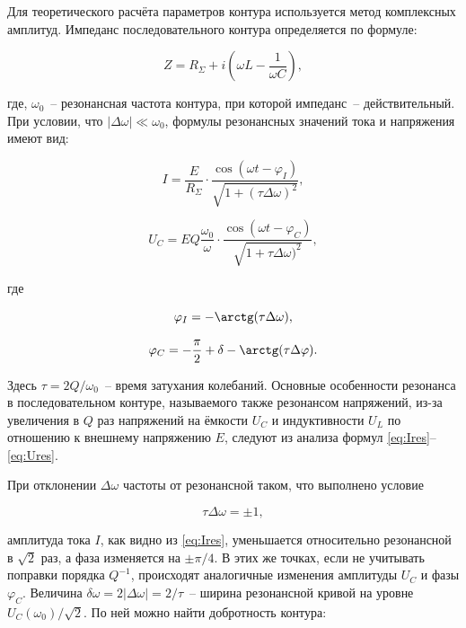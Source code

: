 \documentclass[a4paper,12pt]{article} %
\begin{document}
Для теоретического расчёта параметров контура используется метод комплексных амплитуд. Импеданс последовательного контура определяется по формуле:

\begin{equation}\label{импеданс}
	Z = R_\Sigma +i(\omega L - \frac{1}{\omega C}),
\end{equation}

где, $\omega_0$~-- резонансная частота контура, при которой импеданс~-- действительный. При условии, что $ | \Delta \omega | \ll \omega_0 $, формулы резонансных значений тока и напряжения имеют вид:

\begin{equation}\label{eq:Ires}
    I = \frac{E}{R_\Sigma}\cdot\frac{\cos(\omega t - \varphi_I)}{\sqrt{1+(\tau \Delta \omega )^2}}, 
\end{equation}

\begin{equation}\label{eq:Ures}
    U_C = E Q \frac{\omega_0}{\omega}\cdot\frac{\cos(\omega t - \varphi_C)}{\sqrt{1+\tau \Delta \omega )^2}},
\end{equation}

где

\begin{equation*}
	\varphi_I = -\arctg (\tau \Delta \omega ), 
\end{equation*}

\begin{equation}\label{phi_c}
	\varphi_C = -\frac{\pi}{2} + \delta - \arctg (\tau \Delta \varphi ).
\end{equation}

Здесь $ \tau = 2 Q / \omega_0 $~-- время затухания колебаний. Основные особенности резонанса в последовательном контуре, называемого также резонансом напряжений, из-за увеличения в $Q$ раз напряжений на ёмкости $U_C$ и индуктивности $U_L$ по отношению к внешнему напряжению $E$, следуют из анализа формул \eqref{eq:Ires}--\eqref{eq:Ures}. 

При отклонении $\Delta\omega$ частоты от резонансной таком, что выполнено условие 

\begin{equation}\label{eq:tomega}
   \tau\Delta\omega = \pm1, 
\end{equation}

амплитуда тока $I$, как видно из \eqref{eq:Ires}, уменьшается относительно резонансной в $\sqrt{2}$ раз, а фаза изменяется на $\pm\pi/4$. В этих же точках, если не учитывать поправки порядка $Q^{-1}$, происходят аналогичные изменения амплитуды $U_C$ и фазы $\varphi_C$. Величина $\delta\omega = 2|\Delta\omega| = 2/\tau$~-- ширина резонансной кривой на уровне $U_C(\omega_0)/\sqrt{2}$. По ней можно найти добротность контура: 
\end{document}
